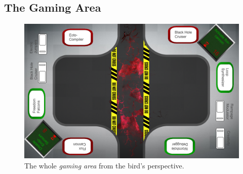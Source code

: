 \documentclass{sigchi}
\begin{document}
\subsection{The Gaming Area}



\begin{figure}[H]
\centering
\includegraphics[width=0.9\columnwidth]{walkthrough/gamingarea}
\caption{The whole \textit{gaming area} from the bird's perspective.}
\label{fig:beamingArea}
\end{figure}
\vspace{2mm}
\end{document}
